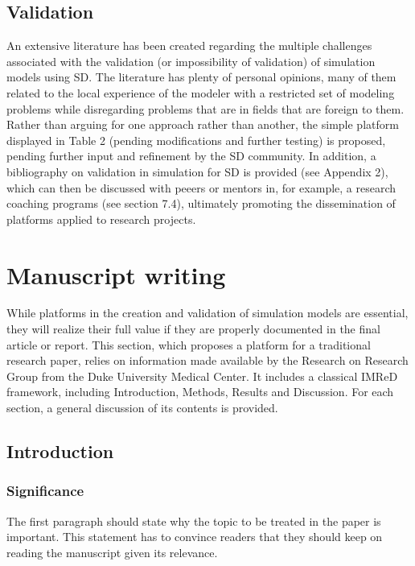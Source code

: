 \documentclass[11pt]{article}
\begin{document}
\subsection {Validation}
An extensive literature has been created regarding the multiple challenges associated with the validation (or impossibility of validation) of simulation models using SD.  The literature has plenty of personal opinions, many of them related to the local experience of the modeler with a restricted set of modeling problems while disregarding problems that are in fields that are foreign to them.  Rather than arguing for one approach rather than another, the simple platform displayed in Table 2 (pending modifications and further testing) is proposed, pending further input and refinement by the SD community.  In addition, a bibliography on validation in simulation for SD is provided (see Appendix 2), which can then be discussed with peeers or mentors in, for example, a research coaching programs (see section 7.4), ultimately promoting the dissemination of platforms applied to research projects.

\section {Manuscript writing}

While platforms in the creation and validation of simulation models are essential, they will realize their full value if they are properly documented in the final article or report.  This section, which proposes a platform for a traditional research paper, relies on information made available by the Research on Research Group \cite{researchonresearch14} from the Duke University Medical Center.  It includes a classical IMReD framework, including Introduction, Methods, Results and Discussion.  For each section, a general discussion of its contents is provided.

\subsection {Introduction}

\subsubsection {Significance}
The first paragraph should state why the topic to be treated in the paper is important. This statement has to convince readers that they should keep on reading the manuscript given its relevance.
\end{document}

